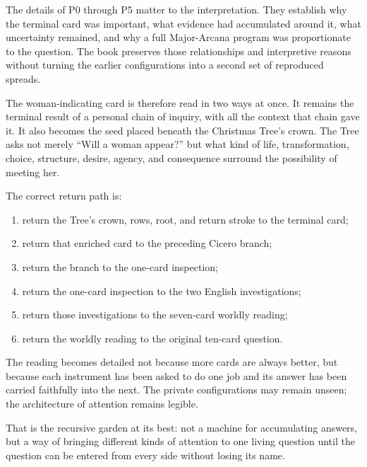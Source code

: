 The details of P0 through P5 matter to the interpretation. They establish why
the terminal card was important, what evidence had accumulated around it, what
uncertainty remained, and why a full Major-Arcana program was proportionate to
the question. The book preserves those relationships and interpretive reasons
without turning the earlier configurations into a second set of reproduced
spreads.

The woman-indicating card is therefore read in two ways at once. It remains the
terminal result of a personal chain of inquiry, with all the context that chain
gave it. It also becomes the seed placed beneath the Christmas Tree's crown.
The Tree asks not merely ``Will a woman appear?'' but what kind of life,
transformation, choice, structure, desire, agency, and consequence surround the
possibility of meeting her.

The correct return path is:

\begin{enumerate}
\item return the Tree's crown, rows, root, and return stroke to the terminal
      card;
\item return that enriched card to the preceding Cicero branch;
\item return the branch to the one-card inspection;
\item return the one-card inspection to the two English investigations;
\item return those investigations to the seven-card worldly reading;
\item return the worldly reading to the original ten-card question.
\end{enumerate}

The reading becomes detailed not because more cards are always better, but
because each instrument has been asked to do one job and its answer has been
carried faithfully into the next. The private configurations may remain unseen;
the architecture of attention remains legible.

That is the recursive garden at its best: not a machine for accumulating
answers, but a way of bringing different kinds of attention to one living
question until the question can be entered from every side without losing its
name.
